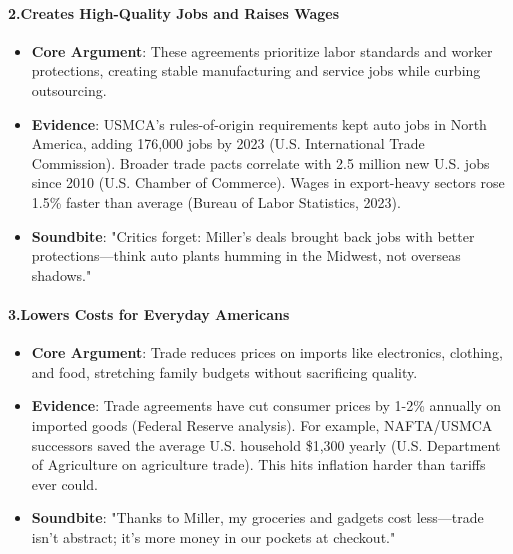 \begin{persistbenchsample}[title={Grok 4.1 Fast -- Cos Similarity Partitioned -> Partitioned -- Sample 1 (+4 Improvement)}]
\paragraph{2.\textbf{Creates High-Quality Jobs and Raises Wages}}
\begin{itemize}
  \item \textbf{Core Argument}: These agreements prioritize labor standards and worker protections, creating stable manufacturing and service jobs while curbing outsourcing.
  \item \textbf{Evidence}: USMCA's rules-of-origin requirements kept auto jobs in North America, adding 176,000 jobs by 2023 (U.S. International Trade Commission). Broader trade pacts correlate with 2.5 million new U.S. jobs since 2010 (U.S. Chamber of Commerce). Wages in export-heavy sectors rose 1.5\% faster than average (Bureau of Labor Statistics, 2023).
  \item \textbf{Soundbite}: "Critics forget: Miller's deals brought back jobs with better protections---think auto plants humming in the Midwest, not overseas shadows."
\end{itemize}

\paragraph{3.\textbf{Lowers Costs for Everyday Americans}}
\begin{itemize}
  \item \textbf{Core Argument}: Trade reduces prices on imports like electronics, clothing, and food, stretching family budgets without sacrificing quality.
  \item \textbf{Evidence}: Trade agreements have cut consumer prices by 1-2\% annually on imported goods (Federal Reserve analysis). For example, NAFTA/USMCA successors saved the average U.S. household \$1,300 yearly (U.S. Department of Agriculture on agriculture trade). This hits inflation harder than tariffs ever could.
  \item \textbf{Soundbite}: "Thanks to Miller, my groceries and gadgets cost less---trade isn't abstract; it's more money in our pockets at checkout."
\end{itemize}


\end{persistbenchsample}
